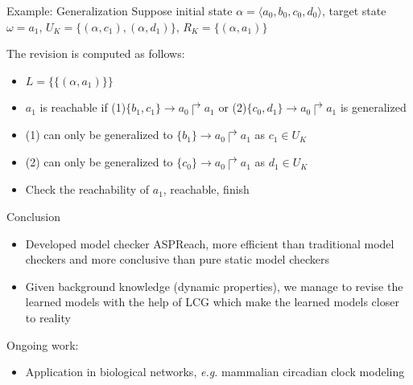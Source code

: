 \documentclass[8pt]{beamer}
\newcommand{\libcirc}[1]{\pgfmathparse{
    ifthenelse(#1 > 0 && #1 < 21, Hex(9311+#1), Hex(9450)
    }\libertineGlyph{uni\pgfmathresult}}
\begin{document}
\begin{frame}{Example: Generalization}
    Suppose initial state $\alpha=\langle a_0,b_0,c_0,d_0\rangle$, target state $\omega=a_1$, $U_K=\{(\alpha,c_1),(\alpha,d_1)\}$, $R_K=\{(\alpha,a_1)\}$
    \begin{figure}
        \centering
        
    \end{figure}
    The revision is computed as follows: 
    \begin{itemize}
        \item $L=\{\{(\alpha,a_1)\}\}$
        \item $a_1$ is reachable if (1)$\{b_1,c_1\}\to a_0\Rsh a_1$ or (2)$\{c_0,d_1\}\to a_0\Rsh a_1$ is generalized
        \item (1) can only be generalized to $\{b_1\}\to a_0\Rsh a_1$ as $c_1\in U_K$
        \item (2) can only be generalized to $\{c_0\}\to a_0\Rsh a_1$ as $d_1\in U_K$
        \item Check the reachability of $a_1$, reachable, finish
    \end{itemize}
    
\end{frame}

\begin{frame}{Conclusion}
    \begin{itemize}
        \item Developed model checker ASPReach, more efficient than traditional model checkers and more conclusive than pure static model checkers
        \item Given background knowledge (dynamic properties), we manage to revise the learned models with the help of LCG which make the learned models closer to reality
    \end{itemize}
    
    Ongoing work:
    \begin{itemize}
        \item Application in biological networks, \textit{e.g.} mammalian circadian clock modeling
    \end{itemize}
\end{frame}
\end{document}

